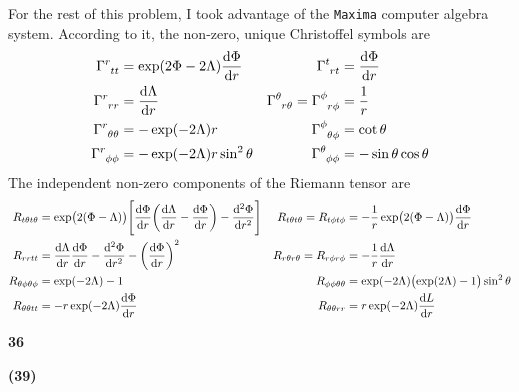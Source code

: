\documentclass[gr-notes.tex]{subfiles}
\begin{document}
For the rest of this problem, I took advantage of the \texttt{Maxima} computer algebra system. According to it, the non-zero, unique Christoffel symbols are
%
\begin{align*}
  \tensor{\Gamma}{^r_{tt}} &=
  \exp(2\Phi - 2\Lambda) \dv{\Phi}{r}
  &
  \tensor{\Gamma}{^t_{rt}} &=
  \dv{\Phi}{r}
  \\
  \tensor{\Gamma}{^r_{rr}} &=
  \dv{\Lambda}{r}
  &
  \tensor{\Gamma}{^\theta_{r \theta}} =
  \tensor{\Gamma}{^\phi_{r \phi}} &=
  \frac{1}{r}
  \\
  \tensor{\Gamma}{^r_{\theta\theta}} &=
  -\exp(-2 \Lambda) r
  &
  \tensor{\Gamma}{^\phi_{\theta\phi}} &=
  \cot\theta
  \\
  \tensor{\Gamma}{^r_{\phi\phi}} &=
  -\exp(-2 \Lambda) r \sin^2\theta
  &
  \tensor{\Gamma}{^\theta_{\phi\phi}} &=
  -\sin\theta \cos\theta
\end{align*}
%
The independent non-zero components of the Riemann tensor are
%
\begin{align*}
  R_{t \theta t \theta} &=
  \exp(2(\Phi-\Lambda)) \qty[
    \dv{\Phi}{r} \qty(\dv{\Lambda}{r} - \dv{\Phi}{r}) - \dv[2]{\Phi}{r}
  ]
  &
  R_{t \theta t \theta} = R_{t \phi t \phi} &=
  -\frac{1}{r} \exp(2(\Phi - \Lambda)) \dv{\Phi}{r}
  \\
  R_{r r t t} &=
  \dv{\Lambda}{r} \dv{\Phi}{r} -
  \dv[2]{\Phi}{r} -
  \qty(\dv{\Phi}{r})^2
  &
  R_{r \theta r \theta} = R_{r \phi r \phi} &=
  -\frac{1}{r} \dv{\Lambda}{r}
  \\
  R_{\theta \phi \theta \phi} &=
  \exp(-2\Lambda) - 1
  &
  R_{\phi \phi \theta \theta} &=
  \exp(-2\Lambda) \qty(\exp(2 \Lambda) - 1) \sin^2\theta
  \\
  R_{\theta \theta t t} &=
  -r \exp(-2 \Lambda) \dv{\Phi}{r}
  &
  R_{\theta \theta r r} &=
  r \exp(-2 \Lambda) \dv{L}{r}
\end{align*}

\textbf{36}


\textbf{(39)}
\end{document}
